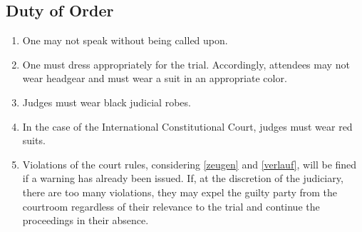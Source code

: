 \documentclass{article}
\begin{document}
\subsection{Duty of Order}\label{gordnung}
\begin{enumerate}[(1)]
    \item One may not speak without being called upon.
    \item One must dress appropriately for the trial. Accordingly, attendees may not wear headgear and must wear a suit in an appropriate color.
    \item Judges must wear black judicial robes.
    \item In the case of the International Constitutional Court, judges must wear red suits.
    \item Violations of the court rules, considering \ref{zeugen} and \ref{verlauf}, will be fined if a warning has already been issued. If, at the discretion of the judiciary, there are too many violations, they may expel the guilty party from the courtroom regardless of their relevance to the trial and continue the proceedings in their absence.
\end{enumerate}
\end{document}
